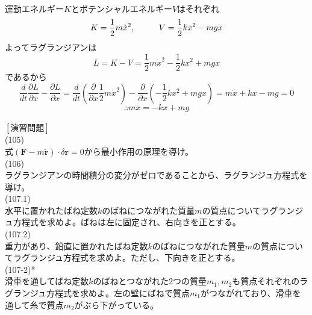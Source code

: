 \documentclass{jsarticle}
\begin{document}
\\
運動エネルギー\(K\)とポテンシャルエネルギー\(V\)はそれぞれ
\[K=\frac{1}{2}m\dot{x}^{2},\hspace{10mm}V=\frac{1}{2}kx^{2}-mgx\]
よってラグランジアンは
\[L=K-V=\frac{1}{2}m\dot{x}^{2}-\frac{1}{2}kx^{2}+mgx\]
であるから
\[\frac{d}{dt}\frac{\partial L}{\partial\dot{x}}-\frac{\partial L}{\partial x}=\frac{d}{dt}\left(\frac{\partial}{\partial\dot{x}}\frac{1}{2}m\dot{x}^{2}\right)-\frac{\partial}{\partial x}\left(-\frac{1}{2}kx^{2}+mgx\right)=m\ddot{x}+kx-mg=0\]
\[\therefore m\ddot{x}=-kx+mg\]
\\
\newpage
\noindent
\([演習問題]\)\\
(105)\\
式\(\displaystyle(\bm{F}-m\ddot{\bm{r}})\cdot\delta\bm{r}=0\)から最小作用の原理を導け。\\
(106)\\
ラグランジアンの時間積分の変分がゼロであることから、ラグランジュ方程式を導け。\\
(107.1)\\
水平に置かれたばね定数\(k\)のばねにつながれた質量\(m\)の質点についてラグランジュ方程式を求めよ。ばねは左に固定され、右向きを正とする。\\
(107.2)\\
重力があり、鉛直に置かれたばね定数\(k\)のばねにつながれた質量\(m\)の質点についてラグランジュ方程式を求めよ。ただし、下向きを正とする。\\
(107-2)*\\
滑車を通してばね定数\(k\)のばねとつながれた2つの質量\(m_{1},m_{2}\)も質点それぞれのラグランジュ方程式を求めよ。左の壁にばねで質点\(m_{1}\)がつながれており、滑車を通して糸で質点\(m_{2}\)がぶら下がっている。
\end{document}
